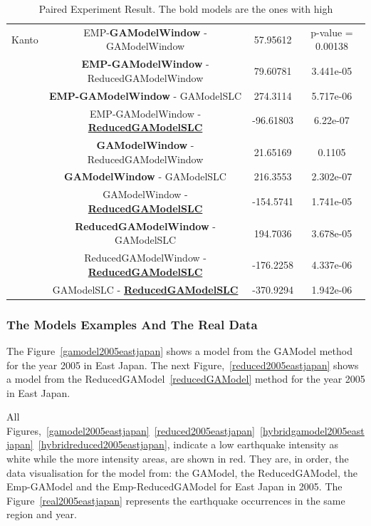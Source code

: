 \begin{table}[!htb]
\begin{center}
\begin{tabular}{|c|c|c|c|}
			
			\hline
			Kanto & EMP-\textbf{GAModelWindow} - GAModelWindow &
			57.95612 & p-value = 0.00138\\
			& \textbf{EMP-GAModelWindow} - ReducedGAModelWindow &
			79.60781 & 3.441e-05\\
			& \textbf{EMP-GAModelWindow} - GAModelSLC &
			274.3114  & 5.717e-06\\
			& EMP-GAModelWindow - \underline{\textbf{ReducedGAModelSLC}} & 
			-96.61803  & 6.22e-07\\
			& \textbf{GAModelWindow} - ReducedGAModelWindow & 
			21.65169  & 0.1105\\
			&\textbf{GAModelWindow} - GAModelSLC &
			216.3553  & 2.302e-07\\
			& GAModelWindow - \underline{\textbf{ReducedGAModelSLC}} &
			-154.5741  & 1.741e-05\\
			& \textbf{ReducedGAModelWindow} - GAModelSLC &
			194.7036  & 3.678e-05\\
			& ReducedGAModelWindow -\underline{\textbf{ReducedGAModelSLC}} &
			-176.2258 & 4.337e-06\\
			& GAModelSLC - \underline{\textbf{ReducedGAModelSLC}} &
			-370.9294 &1.942e-06\\
			\hline
		\end{tabular}
	\end{center}
	\caption{Paired Experiment Result. The bold models are the ones with high}
	\label{Paired}
\end{table}



\subsubsection{The Models Examples And The Real Data}

The Figure~\ref{gamodel2005eastjapan} shows a model from the GAModel method for the year 2005 in East Japan. The next Figure,~\ref{reduced2005eastjapan} shows a model from the ReducedGAModel~\ref{reducedGAModel} method for the year 2005 in East Japan.

All Figures,~\ref{gamodel2005eastjapan}~\ref{reduced2005eastjapan}~\ref{hybridgamodel2005eastjapan}~\ref{hybridreduced2005eastjapan},  indicate a low earthquake intensity as white while the more intensity areas, are shown in red. They are, in order, the data visualisation for the model from: the GAModel, the ReducedGAModel, the Emp-GAModel and the Emp-ReducedGAModel for East Japan in 2005. The Figure~\ref{real2005eastjapan} represents the earthquake occurrences in the same region and year.


